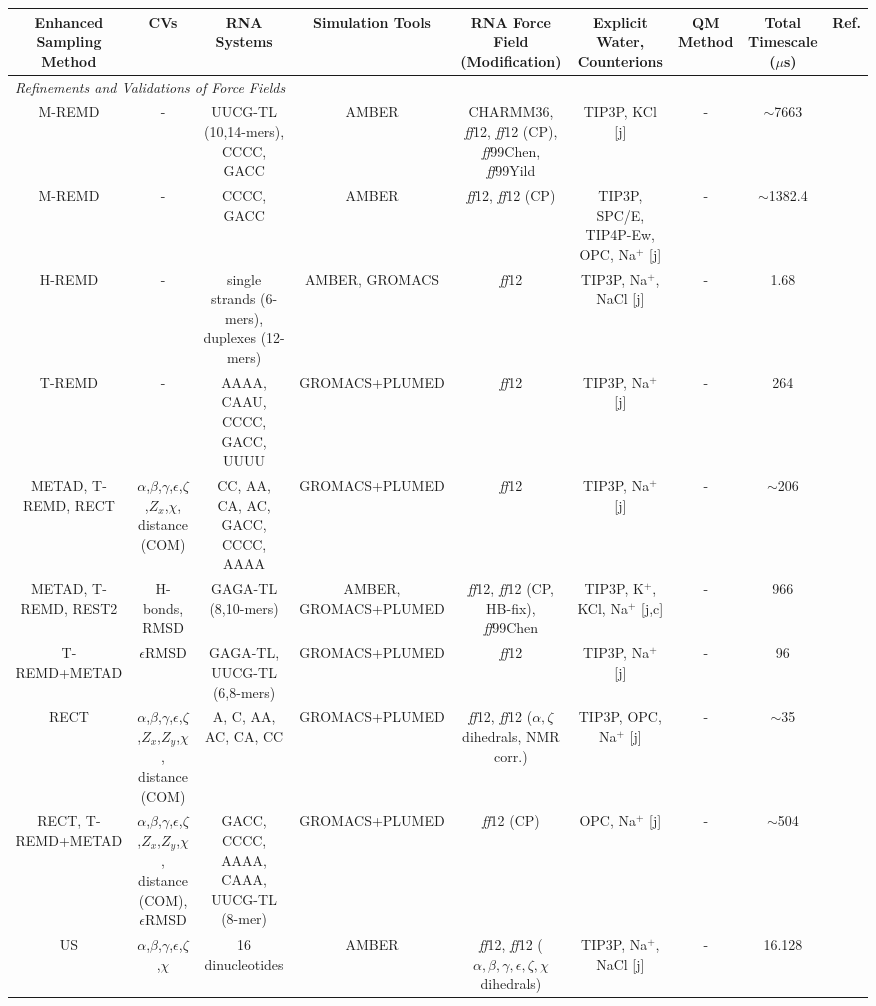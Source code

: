 \begin{tabular}{ccccccccc}
\toprule 
Enhanced Sampling Method  & CVs & RNA Systems & Simulation Tools & RNA Force Field (Modification) & Explicit Water, Counterions & QM Method & Total Timescale ($\mu$s) & Ref.\tabularnewline
\midrule
\midrule 
\multicolumn{9}{l}{\emph{Refinements and Validations of Force Fields}}\tabularnewline
\midrule 
M-REMD & - & UUCG-TL (10,14-mers), CCCC, GACC & AMBER & CHARMM36, \emph{ff}12, \emph{ff}12 (CP), \emph{ff}99Chen, \emph{ff}99Yild & TIP3P, KCl {[}j{]} & - & $\sim$7663 & \cite{bergonzo2015highly}\tabularnewline
\midrule 
M-REMD & - & CCCC, GACC & AMBER & \emph{ff}12, \emph{ff}12 (CP) & TIP3P, SPC/E, TIP4P-Ew, OPC, Na$^{+}$ {[}j{]} & - & $\sim$1382.4 & \cite{bergonzo2015improved}\tabularnewline
\midrule 
H-REMD & - & single strands (6-mers), duplexes (12-mers) & AMBER, GROMACS & \emph{ff}12 & TIP3P, Na$^{+}$, NaCl {[}j{]} & - & 1.68 & \cite{sakuraba2015predicting}\tabularnewline
\midrule 
T-REMD & - & AAAA, CAAU, CCCC, GACC, UUUU & GROMACS+PLUMED & \emph{ff}12 & TIP3P, Na$^{+}$ {[}j{]} & - & 264 & \cite{bottaro2016rna}\tabularnewline
\midrule 
METAD, T-REMD, RECT & $\alpha$,$\beta$,$\gamma$,$\epsilon$,$\zeta$,$Z_{x}$,$\chi$, distance (COM) & CC, AA, CA, AC, GACC, CCCC, AAAA & GROMACS+PLUMED & \emph{ff}12 & TIP3P, Na$^{+}$ {[}j{]} & - & $\sim$206 & \cite{gil2016empirical}\tabularnewline
\midrule 
METAD, T-REMD, REST2 & H-bonds, RMSD  & GAGA-TL (8,10-mers) & AMBER, GROMACS+PLUMED & \emph{ff}12, \emph{ff}12 (CP, HB-fix), \emph{ff}99Chen & TIP3P, K$^{+}$, KCl, Na$^{+}$ {[}j,c{]} & - & 966 & \cite{Kuhrova2016}\tabularnewline
\midrule 
T-REMD+METAD & $\epsilon$RMSD & GAGA-TL, UUCG-TL (6,8-mers) & GROMACS+PLUMED & \emph{ff}12 & TIP3P, Na$^{+}$ {[}j{]} & - & 96 & \cite{bottaro2016free}\tabularnewline
\midrule 
RECT & $\alpha$,$\beta$,$\gamma$,$\epsilon$,$\zeta$,$Z_{x}$,$Z_{y}$,$\chi$, distance (COM) & A, C, AA, AC, CA, CC & GROMACS+PLUMED & \emph{ff}12, \emph{ff}12 ($\alpha,\zeta$ dihedrals, NMR corr.) & TIP3P, OPC, Na$^{+}$ {[}j{]} & - & $\sim$35 & \cite{cesari2016maxent}\tabularnewline
\midrule 
RECT, T-REMD+METAD & $\alpha$,$\beta$,$\gamma$,$\epsilon$,$\zeta$,$Z_{x}$,$Z_{y}$,$\chi$, distance (COM), $\epsilon$RMSD & GACC, CCCC, AAAA, CAAA, UUCG-TL (8-mer)  & GROMACS+PLUMED & \emph{ff}12 (CP) & OPC, Na$^{+}$ {[}j{]} & - & $\sim$504 & \cite{yang2016predicting}\tabularnewline
\midrule 
US & $\alpha$,$\beta$,$\gamma$,$\epsilon$,$\zeta$,$\chi$ & 16 dinucleotides & AMBER & \emph{ff}12, \emph{ff}12 ($\alpha,\beta,\gamma,\epsilon,\zeta,\chi$ dihedrals) & TIP3P, Na$^{+}$, NaCl {[}j{]} & - & 16.128 & \cite{aytenfisu2017revised}\tabularnewline

\end{tabular}
